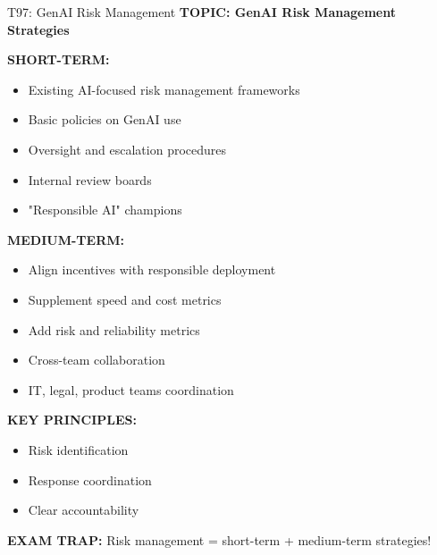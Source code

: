 \documentclass[8pt]{beamer}
\begin{document}
	\begin{frame}{T97: GenAI Risk Management}
		\fontsize{6.5}{7.5}\selectfont
		\textbf{TOPIC: GenAI Risk Management Strategies}
		
		\vspace{0.1cm}
		\textbf{SHORT-TERM:}
		\begin{itemize}
			\item Existing AI-focused risk management frameworks
			\item Basic policies on GenAI use
			\item Oversight and escalation procedures
			\item Internal review boards
			\item "Responsible AI" champions
		\end{itemize}
		
		\vspace{0.1cm}
		\textbf{MEDIUM-TERM:}
		\begin{itemize}
			\item Align incentives with responsible deployment
			\item Supplement speed and cost metrics
			\item Add risk and reliability metrics
			\item Cross-team collaboration
			\item IT, legal, product teams coordination
		\end{itemize}
		
		\vspace{0.1cm}
		\textbf{KEY PRINCIPLES:}
		\begin{itemize}
			\item Risk identification
			\item Response coordination
			\item Clear accountability
		\end{itemize}
		
		\textcolor{myred}{\textbf{EXAM TRAP:}} Risk management = \textcolor{myblue}{short-term + medium-term strategies}!
	\end{frame}
	
\end{document}
